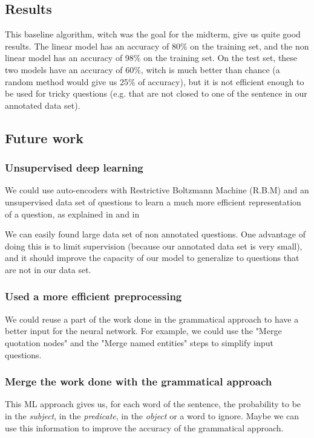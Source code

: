 \subsection{Results}

This baseline algorithm, witch was the goal for the midterm, give us quite good results.
The linear model has an accuracy of 80\% on the training set, and the non linear model has an accuracy of 98\% on the training set.
On the test set, these two models have an accuracy of 60\%, witch is much better than chance (a random method would give us 25\% of accuracy), but it is not efficient enough to be used for tricky questions (e.g. that are not closed to one of the sentence in our annotated data set).

\subsection{Future work}

\subsubsection{Unsupervised deep learning}

We could use auto-encoders  with Restrictive Boltzmann Machine (R.B.M) and an unsupervised data set of questions to learn a much more efficient representation of a question, as explained in \cite{fischer2012introduction} and in \cite{hinton2006reducing}

We can easily found large data set of non annotated questions.
One advantage of doing this is to limit supervision (because our annotated data set is very small), and it should improve the capacity of our model to generalize to questions that are not in our data set.

\subsubsection{Used a more efficient preprocessing}

We could reuse a part of the work done in the grammatical approach to have a better input for the neural network. For example, we could use the "Merge quotation nodes" and the "Merge named entities" steps to simplify input questions.

\subsubsection{Merge the work done with the grammatical approach}

This ML approach gives us, for each word of the sentence, the probability to be in the \textit{subject}, in the \textit{predicate}, in the \textit{object} or a word to ignore.
Maybe we can use this information to improve the accuracy of the grammatical approach.


